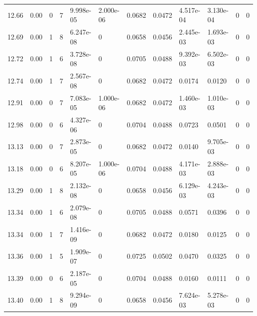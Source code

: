 \documentclass[preview]{standalone}
\begin{document}
{{{{{{\begin{tabular}{L{1.2cm}C{1.2cm} C{0.3cm}C{0.5cm} C{1.4cm}C{1.4cm} C{1.4cm}C{1.4cm} C{1.6cm}C{1.6cm} C{1.6cm}C{1.6cm}}
  12.66  &  0.00  & 0     &  7 &  9.998e-05  & 2.000e-06  &  0.0682&   0.0472& 4.517e-04 & 3.130e-04   &  0 & 0  \\ 
  12.69  &  0.00  & 1     &  8 &  6.247e-08  & 0  &  0.0658&   0.0456& 2.445e-03 & 1.693e-03   &  0 & 0  \\ 
  12.72  &  0.00  & 1     &  6 &  3.728e-08  & 0  &  0.0705&   0.0488& 9.392e-03 & 6.502e-03   &  0 & 0  \\ 
  12.74  &  0.00  & 1     &  7 &  2.567e-08  & 0  &  0.0682&   0.0472& 0.0174 & 0.0120   &  0 & 0  \\ 
  12.91  &  0.00  & 0     &  7 &  7.083e-05  & 1.000e-06  &  0.0682&   0.0472& 1.460e-03 & 1.010e-03   &  0 & 0  \\ 
  12.98  &  0.00  & 0     &  6 &  4.327e-06  & 0  &  0.0704&   0.0488& 0.0723 & 0.0501   &  0 & 0  \\ 
  13.13  &  0.00  & 0     &  7 &  2.873e-05  & 0  &  0.0682&   0.0472& 0.0140 & 9.705e-03   &  0 & 0  \\ 
  13.18  &  0.00  & 0     &  6 &  8.207e-05  & 1.000e-06  &  0.0704&   0.0488& 4.171e-03 & 2.888e-03   &  0 & 0  \\ 
  13.29  &  0.00  & 1     &  8 &  2.132e-08  & 0  &  0.0658&   0.0456& 6.129e-03 & 4.243e-03   &  0 & 0  \\ 
  13.34  &  0.00  & 1     &  6 &  2.079e-08  & 0  &  0.0705&   0.0488& 0.0571 & 0.0396   &  0 & 0  \\ 
  13.34  &  0.00  & 1     &  7 &  1.416e-09  & 0  &  0.0682&   0.0472& 0.0180 & 0.0125   &  0 & 0  \\ 
  13.36  &  0.00  & 1     &  5 &  1.909e-07  & 0  &  0.0725&   0.0502& 0.0470 & 0.0325   &  0 & 0  \\ 
  13.39  &  0.00  & 0     &  6 &  2.187e-05  & 0  &  0.0704&   0.0488& 0.0160 & 0.0111   &  0 & 0  \\ 
  13.40  &  0.00  & 1     &  8 &  9.294e-09  & 0  &  0.0658&   0.0456& 7.624e-03 & 5.278e-03   &  0 & 0  \\ 
\hline 
\end{tabular} 

}}}}}}
\end{document}
